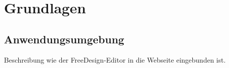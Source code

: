 \chapter{Grundlagen}





\section{Anwendungsumgebung}
Beschreibung wie der FreeDesign-Editor in die Webseite eingebunden ist.



